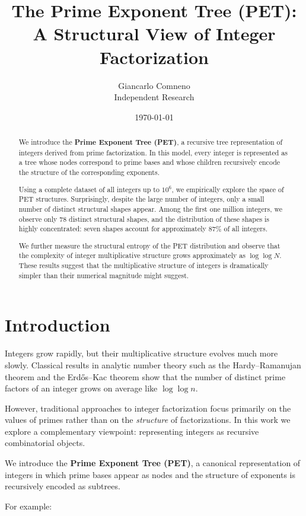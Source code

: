 \documentclass[11pt]{article}
\title{The Prime Exponent Tree (PET): \\
A Structural View of Integer Factorization}
\author{Giancarlo Comneno \\
\small Independent Research}
\date{\today}
\begin{document}
\maketitle

\begin{abstract}
We introduce the \textbf{Prime Exponent Tree (PET)}, a recursive tree representation
of integers derived from prime factorization. In this model, every integer is
represented as a tree whose nodes correspond to prime bases and whose children
recursively encode the structure of the corresponding exponents.

Using a complete dataset of all integers up to $10^6$, we empirically explore the
space of PET structures. Surprisingly, despite the large number of integers,
only a small number of distinct structural shapes appear. Among the first one
million integers, we observe only 78 distinct structural shapes, and the
distribution of these shapes is highly concentrated: seven shapes account for
approximately 87\% of all integers.

We further measure the structural entropy of the PET distribution and observe
that the complexity of integer multiplicative structure grows approximately as
$\log\log N$. These results suggest that the multiplicative structure of integers
is dramatically simpler than their numerical magnitude might suggest.
\end{abstract}

\section{Introduction}

Integers grow rapidly, but their multiplicative structure evolves much more
slowly. Classical results in analytic number theory such as the
Hardy--Ramanujan theorem and the Erd\H{o}s--Kac theorem show that the number
of distinct prime factors of an integer grows on average like $\log\log n$.

However, traditional approaches to integer factorization focus primarily on the
values of primes rather than on the \emph{structure} of factorizations.
In this work we explore a complementary viewpoint: representing integers as
recursive combinatorial objects.

We introduce the \textbf{Prime Exponent Tree (PET)}, a canonical representation
of integers in which prime bases appear as nodes and the structure of exponents
is recursively encoded as subtrees.

For example:
\end{document}
